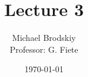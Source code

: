 


\title{Lecture 3}
\date{\today}
\author{Michael Brodskiy\\ \small Professor: G. Fiete}



\maketitle

